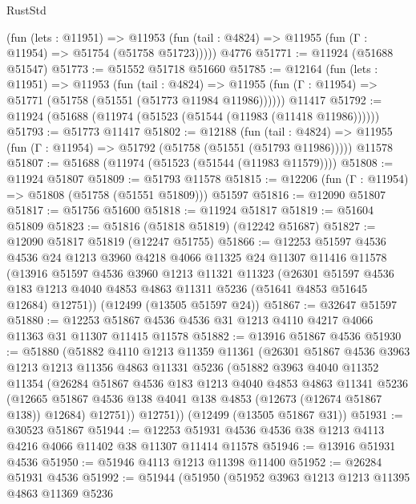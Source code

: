 \begin{lexlean}{RustStd}
\begin{coremodule}
      (fun (lets : @11951) =>
      @11953 (fun (tail : @4824) => @11955 (fun (Γ : @11954) => @51754 (@51758 @51723)))))
    @4776
@51771 := @11924 (@51688 @51547)
@51773 := @51552 @51718 @51660
@51785 := @12164
    (fun (lets : @11951) =>
    @11953
      (fun (tail : @4824) =>
      @11955 (fun (Γ : @11954) => @51771 (@51758 (@51551 (@51773 @11984 @11986))))))
    @11417
@51792 := @11924 (@51688 (@11974 (@51523 (@51544 (@11983 (@11418 @11986))))))
@51793 := @51773 @11417
@51802 := @12188
    (fun (tail : @4824) => @11955 (fun (Γ : @11954) => @51792 (@51758 (@51551 (@51793 @11986)))))
    @11578
@51807 := @51688 (@11974 (@51523 (@51544 (@11983 @11579))))
@51808 := @11924 @51807
@51809 := @51793 @11578
@51815 := @12206 (fun (Γ : @11954) => @51808 (@51758 (@51551 @51809))) @51597
@51816 := @12090 @51807
@51817 := @51756 @51600
@51818 := @11924 @51817
@51819 := @51604 @51809
@51823 := @51816 (@51818 @51819) (@12242 @51687)
@51827 := @12090 @51817 @51819 (@12247 @51755)
@51866 := @12253
    @51597
    @4536
    @4536
    @24
    @1213
    @3960
    @4218
    @4066
    @11325
    @24
    @11307
    @11416
    @11578
    (@13916
      @51597
      @4536
      @3960
      @1213
      @11321
      @11323
      (@26301
        @51597
        @4536
        @183
        @1213
        @4040
        @4853
        @4863
        @11311
        @5236
        (@51641 @4853 @51645 @12684)
        @12751))
    (@12499 (@13505 @51597 @24))
@51867 := @32647 @51597
@51880 := @12253 @51867 @4536 @4536 @31 @1213 @4110 @4217 @4066 @11363 @31 @11307 @11415 @11578
@51882 := @13916 @51867 @4536
@51930 := @51880
    (@51882
      @4110
      @1213
      @11359
      @11361
      (@26301
        @51867
        @4536
        @3963
        @1213
        @1213
        @11356
        @4863
        @11331
        @5236
        (@51882
          @3963
          @4040
          @11352
          @11354
          (@26284
            @51867
            @4536
            @183
            @1213
            @4040
            @4853
            @4863
            @11341
            @5236
            (@12665 @51867 @4536 @138 @4041 @138 @4853 (@12673 (@12674 @51867 @138)) @12684)
            @12751))
        @12751))
    (@12499 (@13505 @51867 @31))
@51931 := @30523 @51867
@51944 := @12253 @51931 @4536 @4536 @38 @1213 @4113 @4216 @4066 @11402 @38 @11307 @11414 @11578
@51946 := @13916 @51931 @4536
@51950 := @51946 @4113 @1213 @11398 @11400
@51952 := @26284 @51931 @4536
@51992 := @51944
    (@51950
      (@51952
        @3963
        @1213
        @1213
        @11395
        @4863
        @11369
        @5236

\end{coremodule}
\end{lexlean}
